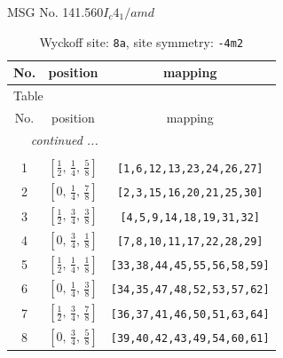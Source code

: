 \documentclass[fleqn,8pt]{jsarticle}
\begin{document}
\setcounter{MaxMatrixCols}{32}

\renewcommand{\tablename}{Table~}
\renewcommand{\figurename}{Figure~}
\begin{center}
\LARGE
MSG No. 141.560\quad$I_{c}4_{1}/amd$
\end{center}
\renewcommand{\arraystretch}{1.2}
\begin{longtable}{ccc}
\caption{Wyckoff site: {\tt 8a}, site symmetry: {\tt -4m2}}
 \\
 \hline \hline
No. & position & mapping \\ \hline \endfirsthead

\multicolumn{2}{l}{\tablename\ \thetable{}} \\
 \hline \hline
No. & position & mapping \\ \hline \endhead

 \hline \hline
\multicolumn{2}{r}{\footnotesize\it continued ...} \\ \endfoot

 \hline \hline
\multicolumn{2}{r}{} \\ \endlastfoot

1 & $\left[ \frac{1}{2},\, \frac{1}{4},\, \frac{5}{8} \right]$ & {\tt [1,6,12,13,23,24,26,27]} \\ \hline
2 & $\left[ 0,\, \frac{1}{4},\, \frac{7}{8} \right]$ & {\tt [2,3,15,16,20,21,25,30]} \\ \hline
3 & $\left[ \frac{1}{2},\, \frac{3}{4},\, \frac{3}{8} \right]$ & {\tt [4,5,9,14,18,19,31,32]} \\ \hline
4 & $\left[ 0,\, \frac{3}{4},\, \frac{1}{8} \right]$ & {\tt [7,8,10,11,17,22,28,29]} \\ \hline
5 & $\left[ \frac{1}{2},\, \frac{1}{4},\, \frac{1}{8} \right]$ & {\tt [33,38,44,45,55,56,58,59]} \\ \hline
6 & $\left[ 0,\, \frac{1}{4},\, \frac{3}{8} \right]$ & {\tt [34,35,47,48,52,53,57,62]} \\ \hline
7 & $\left[ \frac{1}{2},\, \frac{3}{4},\, \frac{7}{8} \right]$ & {\tt [36,37,41,46,50,51,63,64]} \\ \hline
8 & $\left[ 0,\, \frac{3}{4},\, \frac{5}{8} \right]$ & {\tt [39,40,42,43,49,54,60,61]} \\
\end{longtable}
\renewcommand{\arraystretch}{1.2}
\end{document}
